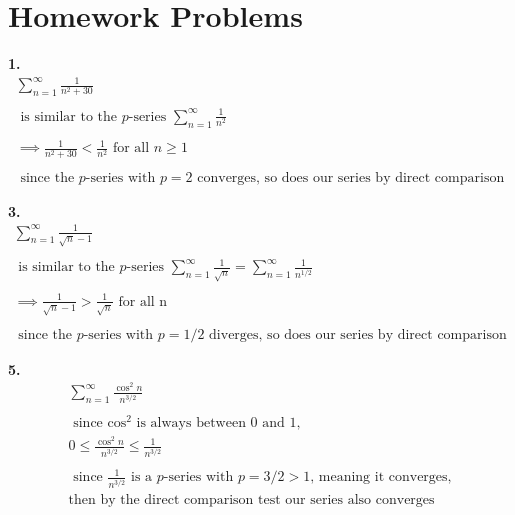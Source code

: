 \documentclass{article}
\begin{document}
\newpage

%
%
%
%

\section*{Homework Problems}


\noindent
\textbf{
1.
}
\\
\begin{gather*}
\sum_{n=1}^{\infty} \frac{1}{n^2+30}
\\
\\
\text { is similar to the $p$-series }
\sum_{n=1}^{\infty} \frac{1}{n^2}
\\
\\
\implies \frac{1}{n^2+30}<\frac{1}{n^2}
\text{ for all } n \geq 1
\\
\\
\text{ since the $p$-series with $p=2$ converges, so does our series by direct comparison}
\end{gather*}


\noindent
\textbf{
3.
}
\\
\begin{gather*}
\sum_{n=1}^{\infty} \frac{1}{\sqrt{n}-1}
\\
\\
\text { is similar to the $p$-series }
\sum_{n=1}^{\infty} \frac{1}{\sqrt{n}}=\sum_{n=1}^{\infty} \frac{1}{n^{1/2}}
\\
\\
\implies  \frac{1}{\sqrt{n}-1}>\frac{1}{\sqrt{n}}
\text{ for all n }
\\
\\
\text{ since the $p$-series with $p=1/2$ diverges, so does our series by direct comparison}
\end{gather*}


\noindent
\textbf{
5.
}
\\
\begin{gather*}
\sum_{n=1}^{\infty} \frac{\cos^2 n}{n^{3/2}}
\\
\\
\text{ since $\cos^2$ is always between 0 and 1, }
\\
0 \leq \frac{\cos^2 n}{n^{3/2}} \leq \frac{1}{n^{3/2}}
\\
\\
\text{ since $\frac{1}{n^{3/2}}$ is a $p$-series with $p=3/2>1$, meaning it converges,}
\\
\text{
then by the direct comparison test our series also converges}
\end{gather*}
\end{document}
